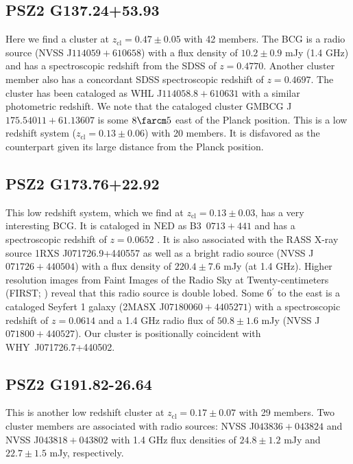 \documentclass[apj, revtex4-1]{emulateapj}
\begin{document}

\subsection{PSZ2 G137.24+53.93} %
Here we find a cluster at $z_\mathrm{cl} = 0.47 \pm 0.05$ with 42 members. The BCG is a radio source (NVSS J$114059+610658$) with a flux density of $10.2 \pm 0.9$ mJy (1.4 GHz) and has a spectroscopic redshift from the SDSS of $z=0.4770$. Another cluster member also has a concordant SDSS spectroscopic redshift of $z=0.4697$. The cluster has been cataloged as WHL J$114058.8+610631$ with a similar photometric redshift. We note that the cataloged cluster GMBCG J$175.54011+61.13607$ is some $8\farcm5$ east of the Planck position. This is a low redshift system ($z_\mathrm{cl} = 0.13 \pm 0.06$) with 20 members. It is disfavored as the counterpart given its large distance from the Planck position.

\subsection{PSZ2 G173.76+22.92} %
This low redshift system, which we find at $z_\mathrm{cl} = 0.13 \pm 0.03$, has a very interesting BCG. It is cataloged in NED as \hbox{B3 $0713+441$} and has a spectroscopic redshift of $z=0.0652$ \citep{Bauer2000}. It is also associated with the RASS X-ray source 1RXS J071726.9+440557 as well as a bright radio source (NVSS J$071726+440504$) with a flux density of $220.4\pm 7.6$ mJy (at 1.4 GHz). Higher resolution images from Faint Images of the Radio Sky at Twenty-centimeters (FIRST; \citealt{Becker1995}) reveal that this radio source is double lobed. Some 6$^\prime$ to the east is a cataloged Seyfert 1 galaxy (2MASX J$07180060+4405271$) with a spectroscopic redshift of $z=0.0614$
\citep{Michel1988} and a 1.4 GHz radio flux of $50.8 \pm 1.6 $ mJy (NVSS J$071800+440527$). Our cluster is positionally coincident with  WHY~J071726.7+440502.


\subsection{PSZ2 G191.82-26.64} %
This is another low redshift cluster at $z_\mathrm{cl} = 0.17 \pm 0.07$ with 29 members. Two cluster members are associated with radio sources: NVSS J$043836+043824$ and NVSS J$043818+043802$ with 1.4 GHz flux densities of $24.8 \pm 1.2$ mJy and $22.7 \pm 1.5$ mJy, respectively.
\end{document}

